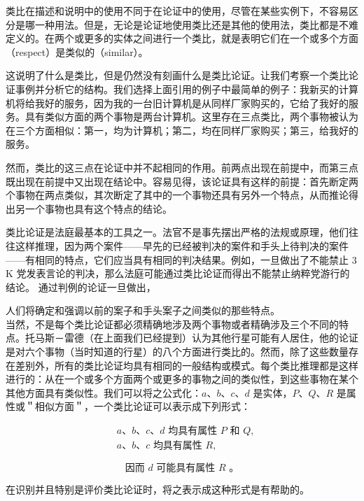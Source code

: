 类比在描述和说明中的使用不同于在论证中的使用，尽管在某些实例下，不容易区分是哪一种用法。但是，无论是论证地使用类比还是其他的使用法，类比都是不难定义的。在两个或更多的实体之间进行一个类比，就是表明它们在一个或多个方面（respect）是类似的（similar）。

这说明了什么是类比，但是仍然没有刻画什么是类比论证。让我们考察一个类比论证事例并分析它的结构。我们选择上面引用的例子中最简单的例子：我新买的计算机将给我好的服务，因为我的一台旧计算机是从同样厂家购买的，它给了我好的服务。具有类似方面的两个事物是两台计算机。这里存在三点类比，两个事物被认为在三个方面相似：第一，均为计算机；第二，均在同样厂家购买；第三，给我好的服务。

然而，类比的这三点在论证中并不起相同的作用。前两点出现在前提中，而第三点既出现在前提中又出现在结论中。容易见得，该论证具有这样的前提：首先断定两个事物在两点类似，其次断定了其中的一个事物还具有另外一个特点，从而推论得出另一个事物也具有这个特点的结论。

类比论证是法庭最基本的工具之一。法官不是事先摆出严格的法规或原理，他们往往这样推理，因为两个案件——早先的已经被判决的案件和手头上待判决的案件——有相同的特点，它们应当具有相同的判决结果。例如，一旦做出了不能禁止 3 K 党发表言论的判决，那么法庭可能通过类比论证而得出不能禁止纳粹党游行的结论。\cite{collin1978} 通过判例的论证一旦做出，

人们将确定和强调以前的案子和手头案子之间类似的那些特点。\\
当然，不是每个类比论证都必须精确地涉及两个事物或者精确涉及三个不同的特点。托马斯－雷德（在上面我们已经提到）认为其他行星可能有人居住，他的论证是对六个事物（当时知道的行星）的八个方面进行类比的。然而，除了这些数量存在差别外，所有的类比论证均具有相同的一般结构或模式。每个类比推理都是这样进行的：从在一个或多个方面两个或更多的事物之间的类似性，到这些事物在某个其他方面具有类似性。我们可以将之公式化：$a 、 b 、 c 、 d$ 是实体，$P 、 Q 、 R$ 是属性或＂相似方面＂，一个类比论证可以表示成下列形式：

$$
\begin{aligned}
& a 、 b 、 c 、 d \text { 均具有属性 } P \text { 和 } Q, \\
& a 、 b 、 c \text { 均具有属性 } R,
\end{aligned}
$$

$$
\text { 因而 } d \text { 可能具有属性 } R \text { 。 }
$$

在识别并且特别是评价类比论证时，将之表示成这种形式是有帮助的。

